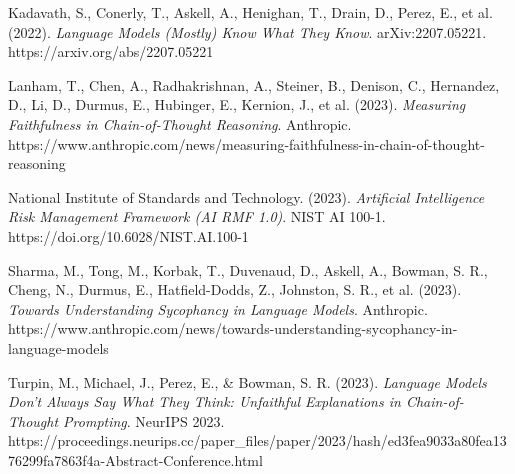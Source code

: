 \documentclass[11pt]{article}
\begin{document}
Kadavath, S., Conerly, T., Askell, A., Henighan, T., Drain, D., Perez, E., et al. (2022). \emph{Language Models (Mostly) Know What They Know}. arXiv:2207.05221. https://arxiv.org/abs/2207.05221

Lanham, T., Chen, A., Radhakrishnan, A., Steiner, B., Denison, C., Hernandez, D., Li, D., Durmus, E., Hubinger, E., Kernion, J., et al. (2023). \emph{Measuring Faithfulness in Chain-of-Thought Reasoning}. Anthropic. https://www.anthropic.com/news/measuring-faithfulness-in-chain-of-thought-reasoning

National Institute of Standards and Technology. (2023). \emph{Artificial Intelligence Risk Management Framework (AI RMF 1.0)}. NIST AI 100-1. https://doi.org/10.6028/NIST.AI.100-1

Sharma, M., Tong, M., Korbak, T., Duvenaud, D., Askell, A., Bowman, S. R., Cheng, N., Durmus, E., Hatfield-Dodds, Z., Johnston, S. R., et al. (2023). \emph{Towards Understanding Sycophancy in Language Models}. Anthropic. https://www.anthropic.com/news/towards-understanding-sycophancy-in-language-models

Turpin, M., Michael, J., Perez, E., \& Bowman, S. R. (2023). \emph{Language Models Don't Always Say What They Think: Unfaithful Explanations in Chain-of-Thought Prompting}. NeurIPS 2023. https://proceedings.neurips.cc/paper\_files/paper/2023/hash/ed3fea9033a80fea1376299fa7863f4a-Abstract-Conference.html
\end{document}
